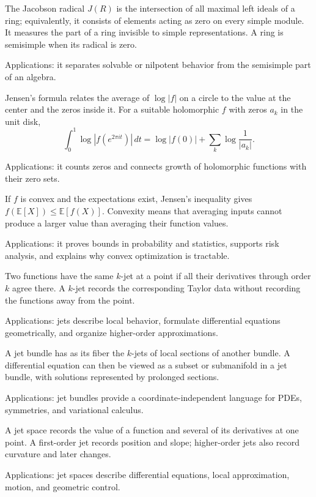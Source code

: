 The Jacobson radical $J(R)$ is the intersection of all maximal left ideals of a ring; equivalently, it consists of elements acting as zero on every simple module. It measures the part of a ring invisible to simple representations. A ring is semisimple when its radical is zero. \par\noindent Applications: it separates solvable or nilpotent behavior from the semisimple part of an algebra.

Jensen's formula relates the average of $\log|f|$ on a circle to the value at the center and the zeros inside it. For a suitable holomorphic $f$ with zeros $a_k$ in the unit disk,
\[
\int_0^1\log|f(e^{2\pi it})|\,dt=\log|f(0)|+\sum_k\log\frac1{|a_k|}.
\]
\par\noindent Applications: it counts zeros and connects growth of holomorphic functions with their zero sets.

If $f$ is convex and the expectations exist, Jensen's inequality gives $f(\mathbb E[X])\leq\mathbb E[f(X)]$. Convexity means that averaging inputs cannot produce a larger value than averaging their function values. \par\noindent Applications: it proves bounds in probability and statistics, supports risk analysis, and explains why convex optimization is tractable.

Two functions have the same $k$-jet at a point if all their derivatives through order $k$ agree there. A $k$-jet records the corresponding Taylor data without recording the functions away from the point. \par\noindent Applications: jets describe local behavior, formulate differential equations geometrically, and organize higher-order approximations.

A jet bundle has as its fiber the $k$-jets of local sections of another bundle. A differential equation can then be viewed as a subset or submanifold in a jet bundle, with solutions represented by prolonged sections. \par\noindent Applications: jet bundles provide a coordinate-independent language for PDEs, symmetries, and variational calculus.

A jet space records the value of a function and several of its derivatives at one point. A first-order jet records position and slope; higher-order jets also record curvature and later changes. \par\noindent Applications: jet spaces describe differential equations, local approximation, motion, and geometric control.

